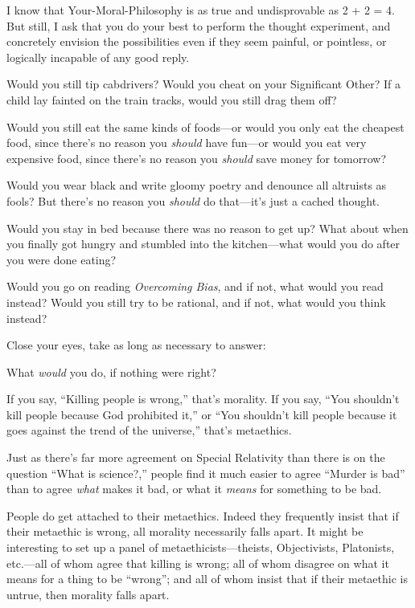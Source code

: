 {
 I know that Your-Moral-Philosophy is as true and undisprovable as
2 + 2 = 4. But still, I ask that you do your best to perform the
thought experiment, and concretely envision the possibilities even if
they seem painful, or pointless, or logically incapable of any good
reply.}

{
 Would you still tip cabdrivers? Would you cheat on your
Significant Other? If a child lay fainted on the train tracks, would
you still drag them off?}

{
 Would you still eat the same kinds of foods---or would you only
eat the cheapest food, since there's no reason you
\textit{should} have fun---or would you eat very expensive food, since
there's no reason you \textit{should} save money for
tomorrow?}

{
 Would you wear black and write gloomy poetry and denounce all
altruists as fools? But there's no reason you
\textit{should} do that---it's just a cached thought.}

{
 Would you stay in bed because there was no reason to get up? What
about when you finally got hungry and stumbled into the kitchen---what
would you do after you were done eating?}

{
 Would you go on reading \textit{Overcoming Bias}, and if not, what
would you read instead? Would you still try to be rational, and if not,
what would you think instead?}

{
 Close your eyes, take as long as necessary to answer:}

{
 What \textit{would} you do, if nothing were right?}

\myendsectiontext


{
 If you say, ``Killing people is
wrong,'' that's morality. If you say,
``You shouldn't kill people because
God prohibited it,'' or ``You
shouldn't kill people because it goes against the trend
of the universe,'' that's
metaethics.}

{
 Just as there's far more agreement on Special
Relativity than there is on the question ``What is
science?,'' people find it much easier to agree
``Murder is bad'' than to agree
\textit{what} makes it bad, or what it \textit{means} for something to
be bad.}

{
 People do get attached to their metaethics. Indeed they frequently
insist that if their metaethic is wrong, all morality necessarily falls
apart. It might be interesting to set up a panel of
metaethicists---theists, Objectivists, Platonists, etc.---all of whom
agree that killing is wrong; all of whom disagree on what it means for
a thing to be ``wrong''; and all of
whom insist that if their metaethic is untrue, then morality falls
apart.}

